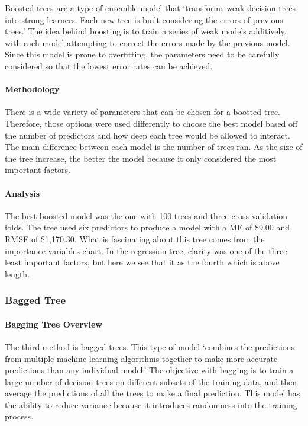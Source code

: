 \documentclass[
  paper=a4,
  ,captions=tableheading
]{scrartcl}
\begin{document}
Boosted trees are a type of ensemble model that `transforms weak
decision trees into strong learners. Each new tree is built considering
the errors of previous trees.' The idea behind boosting is to train a
series of weak models additively, with each model attempting to correct
the errors made by the previous model. Since this model is prone to
overfitting, the parameters need to be carefully considered so that the
lowest error rates can be achieved.

\hypertarget{methodology-1}{%
\paragraph{Methodology}\label{methodology-1}}

There is a wide variety of parameters that can be chosen for a boosted
tree. Therefore, those options were used differently to choose the best
model based off the number of predictors and how deep each tree would be
allowed to interact. The main difference between each model is the
number of trees ran. As the size of the tree increase, the better the
model because it only considered the most important factors.

\hypertarget{analysis-1}{%
\paragraph{Analysis}\label{analysis-1}}

The best boosted model was the one with 100 trees and three
cross-validation folds. The tree used six predictors to produce a model
with a ME of \$9.00 and RMSE of \$1,170.30. What is fascinating about
this tree comes from the importance variables chart. In the regression
tree, clarity was one of the three least important factors, but here we
see that it as the fourth which is above length.

\hypertarget{bagged-tree}{%
\subsubsection{Bagged Tree}\label{bagged-tree}}

\hypertarget{bagging-tree-overview}{%
\paragraph{Bagging Tree Overview}\label{bagging-tree-overview}}

The third method is bagged trees. This type of model `combines the
predictions from multiple machine learning algorithms together to make
more accurate predictions than any individual model.' The objective with
bagging is to train a large number of decision trees on different
subsets of the training data, and then average the predictions of all
the trees to make a final prediction. This model has the ability to
reduce variance because it introduces randomness into the training
process.
\end{document}
